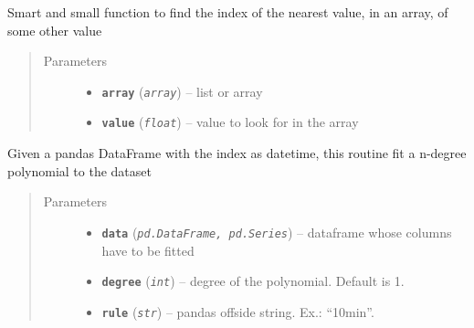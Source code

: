 \documentclass[a4paper,10pt,oneside]{sphinxmanual}
\begin{document}
\begin{fulllineitems}
\label{pymicra.algs:pymicra.algs.general.find_nearest}
Smart and small function to find the index of the nearest value, in an array, of some other value
\begin{quote}\begin{description}
\item[{Parameters}] \leavevmode\begin{itemize}
\item {} 
\textbf{\texttt{array}} (\emph{\texttt{array}}) -- list or array

\item {} 
\textbf{\texttt{value}} (\emph{\texttt{float}}) -- value to look for in the array

\end{itemize}

\end{description}\end{quote}

\end{fulllineitems}


\begin{fulllineitems}
\label{pymicra.algs:pymicra.algs.general.fitByDate}
Given a pandas DataFrame with the index as datetime, this routine
fit a n-degree polynomial to the dataset
\begin{quote}\begin{description}
\item[{Parameters}] \leavevmode\begin{itemize}
\item {} 
\textbf{\texttt{data}} (\emph{\texttt{pd.DataFrame, pd.Series}}) -- dataframe whose columns have to be fitted

\item {} 
\textbf{\texttt{degree}} (\emph{\texttt{int}}) -- degree of the polynomial. Default is 1.

\item {} 
\textbf{\texttt{rule}} (\emph{\texttt{str}}) -- pandas offside string. Ex.: ``10min''.

\end{itemize}

\end{description}\end{quote}

\end{fulllineitems}
\end{document}
